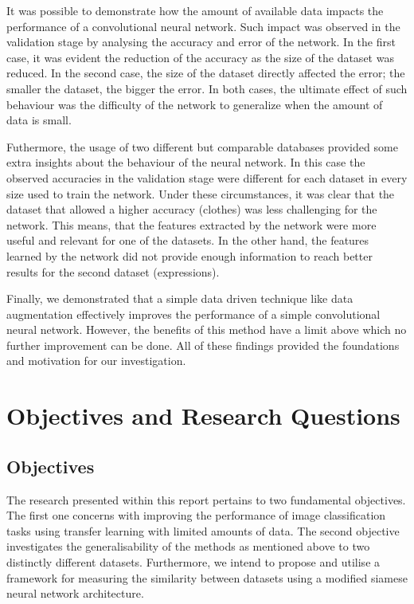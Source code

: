 \documentclass{article}
\begin{document}
It was possible to demonstrate how the amount of available data impacts the performance of a convolutional neural network. Such impact was observed in the validation stage by analysing the accuracy and error of the network. In the first case, it was evident the reduction of the accuracy as the size of the dataset was reduced. In the second case, the size of the dataset directly affected the error; the smaller the dataset, the bigger the error. In both cases, the ultimate effect of such behaviour was the difficulty of the network to generalize when the amount of data is small.

Futhermore, the usage of two different but comparable databases provided some extra insights about the behaviour of the neural network. In this case the observed accuracies in the validation stage were different for each dataset in every size used to train the network. Under these circumstances, it was clear that the dataset that allowed a higher accuracy (clothes) was less challenging for the network. This means, that the features extracted by the network were more useful and relevant for one of the datasets. In the other hand, the features learned by the network did not provide enough information to reach better results for the second dataset (expressions).

Finally, we demonstrated that a simple data driven technique like data augmentation effectively improves the performance of a simple convolutional neural network. However, the benefits of this method have a limit above which no further improvement can be done. All of these findings provided the foundations and motivation for our investigation.

\section{Objectives and Research Questions}
\label{sec:obj_questions}

\subsection{Objectives}
\label{sec:objectives}

The research presented within this report pertains to two fundamental objectives. The first one concerns with improving the performance of image classification tasks using transfer learning with limited amounts of data. The second objective investigates the generalisability of the methods as mentioned above to two distinctly different datasets. Furthermore, we intend to propose and utilise a framework for measuring the similarity between datasets using a modified siamese neural network \cite{koch} architecture.
\end{document}
